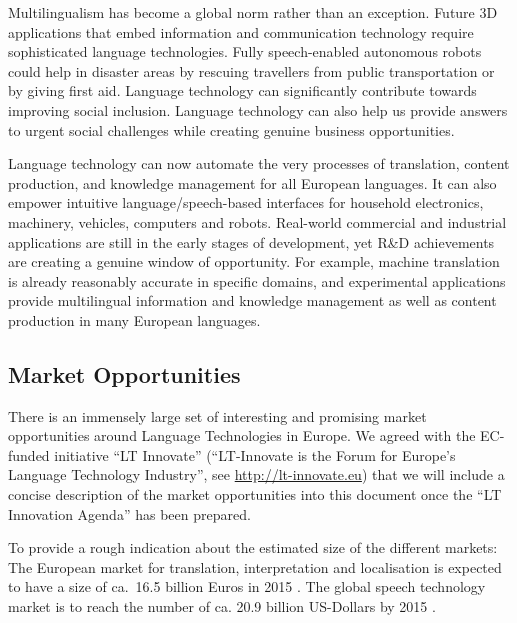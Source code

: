 \documentclass[10pt, plain]{../../metanetpaper}
\begin{document}
\begin{multicols}{2}
Multilingualism has become a global norm rather than an exception. Future 3D applications that embed information and communication technology require sophisticated language technologies. Fully speech-enabled autonomous robots could help in disaster areas by rescuing travellers from public transportation or by giving first aid. Language technology can significantly contribute towards improving social inclusion. Language technology can also help us provide answers to urgent social challenges while creating genuine business opportunities.

Language technology can now automate the very processes of translation, content production, and knowledge management for all European languages. It can also empower intuitive language/speech-based interfaces for household electronics, machinery, vehicles, computers and robots. Real-world commercial and industrial applications are still in the early stages of development, yet R\&D achievements are creating a genuine window of opportunity. For example, machine translation is already reasonably accurate in specific domains, and experimental applications provide multilingual information and knowledge management as well as content production in many European languages. 

\subsection{Market Opportunities}
\label{sec:market-opportunities}

There is an immensely large set of interesting and promising market opportunities around Language Technologies in Europe. We agreed with the EC-funded initiative ``LT Innovate'' (``LT-Innovate is the Forum for Europe's Language Technology Industry'', see \url{http://lt-innovate.eu}) that we will include a concise description of the market opportunities into this document once the ``LT Innovation Agenda'' has been prepared.

To provide a rough indication about the estimated size of the different markets: The European market for translation, interpretation and localisation is expected to have a size of ca.~16.5 billion Euros in 2015 \cite{EC3}. The global speech technology market is to reach the number of ca. 20.9 billion US-Dollars by 2015 \cite{gia2012}.

\end{multicols}

\clearpage

\end{document}
